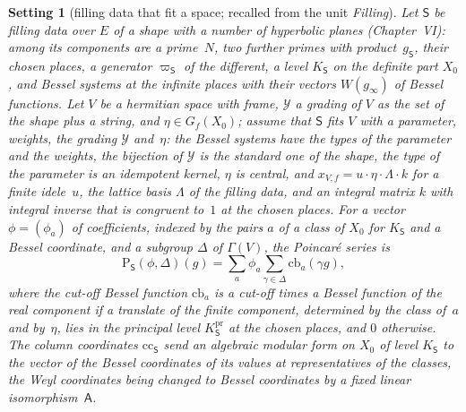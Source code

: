 \documentclass[11pt,a4paper]{article}
\newcommand{\m}[1]{\mbox{$#1$}}        %
\theoremstyle{plainx}
\theoremstyle{uprightx}
\newtheorem{setting}[theorem]{Setting}          %
\begin{document}
\begin{setting}[filling data that fit a space; recalled from the unit \emph{Filling}]\label{s:filling}
Let $\mathsf{S}$ be filling data over $E$ of a shape with a number of hyperbolic planes (Chapter~VI): among its
components are a prime~$N$, two further primes with product~$g_{\mathsf{S}}$, their chosen places, a generator
$\varpi_{\mathsf{S}}$ of the different, a level $K_{\mathsf{S}}$ on the definite part $X_0$, and Bessel systems
at the infinite places with their vectors \m{W(g_\infty)} of Bessel functions. Let $V$ be a hermitian space with
frame, $\mathcal{Y}$ a grading of $V$ as the set of the shape plus a string, and \m{\eta\in G_f(X_0)}; assume
that $\mathsf{S}$ \emph{fits} $V$ with a parameter, weights, the grading $\mathcal{Y}$ and~$\eta$: the Bessel
systems have the types of the parameter and the weights, the bijection of $\mathcal{Y}$ is the standard one of the
shape, the type of the parameter is an idempotent kernel, $\eta$ is central, and $x_{V,f}=u\cdot\eta\cdot\Lambda\cdot k$
for a finite idele~$u$, the lattice basis $\Lambda$ of the filling data, and an integral matrix $k$ with integral
inverse that is congruent to~$1$ at the chosen places. For a vector \m{\phi=(\phi_a)} of coefficients, indexed by
the pairs $a$ of a class of $X_0$ for $K_{\mathsf{S}}$ and a Bessel coordinate, and a subgroup $\Delta$ of
$\Gamma(V)$, the \emph{Poincar\'e series} is
\[\mathrm{P}_{\mathsf{S}}(\phi,\Delta)(g)=\sum_a\phi_a\sum_{\gamma\in\Delta}\mathrm{cb}_a(\gamma g),\]
where the cut-off Bessel function $\mathrm{cb}_a$ is a cut-off times a Bessel function of the real component if a
translate of the finite component, determined by the class of~$a$ and by~$\eta$, lies in the principal level
\m{K^{\mathrm{pr}}_{\mathsf{S}}} at the chosen places, and $0$ otherwise. The \emph{column coordinates}
$\mathrm{cc}_{\mathsf{S}}$ send an algebraic modular form on $X_0$ of level $K_{\mathsf{S}}$ to the vector of the
Bessel coordinates of its values at representatives of the classes, the Weyl coordinates being changed to Bessel
coordinates by a fixed linear isomorphism~$\mathsf{A}$.
\end{setting}
\end{document}
